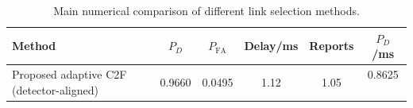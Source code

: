 \begin{table}[t]
    \centering
    \caption{Main numerical comparison of different link selection methods.}
    \label{tab:main_summary}
    \begin{tabular}{l c c c c c}
        \hline
        Method & $P_D$ & $P_{\mathrm{FA}}$ & Delay/ms & Reports & $P_D$/ms \\
        \hline
        Proposed adaptive C2F (detector-aligned) & 0.9660 & 0.0495 & 1.12 & 1.05 & 0.8625 \
        \hline
    \end{tabular}
\end{table}
